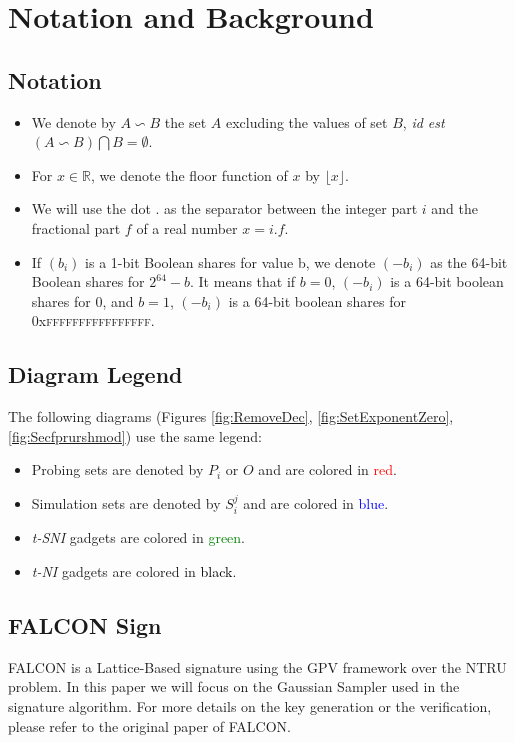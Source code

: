 \documentclass[runningheads]{llncs}
\begin{document}
\section{Notation and Background}\label{sec:background}
\subsection{Notation}
\begin{itemize}
  \item We denote by $A\backsim B$ the set $A$ excluding the values of set $B$, \emph{id est} $(A\backsim B) \bigcap B = \emptyset $.
  \item For $x\in\mathbb{R}$, we denote the floor function of $x$ by $\lfloor x \rfloor$.
  \item We will use the dot $.$ as the separator between the integer part $i$ and the fractional part $f$ of a real number $x=i.f$.
  \item If $(b_i)$ is a 1-bit Boolean shares for value b, we denote $(-b_i)$ as the 64-bit Boolean shares for $2^{64} - b$. It means that if $b=0$, $(-b_i)$ is a 64-bit boolean shares for $0$, and
  $b=1$, $(-b_i)$ is a 64-bit boolean shares for 0x\textsc{ffffffffffffffff}.   
\end{itemize}
%
\subsection{Diagram Legend}
The following diagrams (Figures \ref{fig:RemoveDec}, \ref{fig:SetExponentZero},\ref{fig:Secfprurshmod}) use the same legend:\begin{itemize}
    \item Probing sets are denoted by $P_i$ or $O$ and are colored in \textcolor{red}{red}.
    \item Simulation sets are denoted by $S_i^j$ and are colored in \textcolor{blue}{blue}.
    \item \emph{t-SNI} gadgets are colored in \textcolor{green}{green}.
    \item \emph{t-NI} gadgets are colored in \textcolor{black}{black}.
\end{itemize}
% 
\subsection{FALCON Sign}
FALCON \cite{prest2020falcon} is a Lattice-Based signature using the
GPV framework over the NTRU problem. In this paper we will focus on
the Gaussian Sampler used in the signature algorithm. For more details
on the key generation or the verification, please refer to the
original paper of FALCON\cite{prest2020falcon}.
\end{document}
